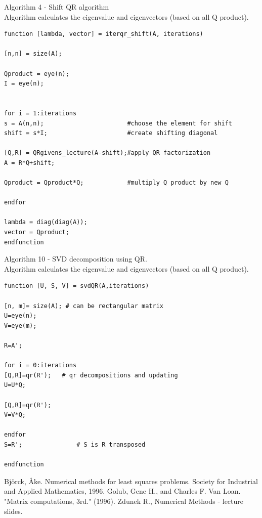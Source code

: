 \documentclass[eng,openany]{mgr}
\begin{document}
Algorithm 4 - Shift QR algorithm\\
Algorithm calculates the eigenvalue and eigenvectors (based on all Q product).
\begin{lstlisting}
function [lambda, vector] = iterqr_shift(A, iterations)

[n,n] = size(A);

Qproduct = eye(n);
I = eye(n);


for i = 1:iterations
s = A(n,n);                       #choose the element for shift
shift = s*I;                      #create shifting diagonal

[Q,R] = QRgivens_lecture(A-shift);#apply QR factorization
A = R*Q+shift;

Qproduct = Qproduct*Q;            #multiply Q product by new Q

endfor

lambda = diag(diag(A));
vector = Qproduct;
endfunction
\end{lstlisting}

Algorithm 10 - SVD decomposition using QR.\\
Algorithm calculates the eigenvalue and eigenvectors (based on all Q product).
\begin{lstlisting}
function [U, S, V] = svdQR(A,iterations)

[n, m]= size(A); # can be rectangular matrix
U=eye(n);   
V=eye(m);

R=A';  

for i = 0:iterations
[Q,R]=qr(R');   # qr decompositions and updating  
U=U*Q;    
     
[Q,R]=qr(R');
V=V*Q;

endfor
S=R';               # S is R transposed

endfunction
\end{lstlisting}
\begin{thebibliography}{8}
Björck, Åke. Numerical methods for least squares problems. Society for Industrial and Applied Mathematics, 1996.
Golub, Gene H., and Charles F. Van Loan. "Matrix computations, 3rd." (1996).
Zdunek R., Numerical Methods - lecture slides.
\end{thebibliography}
\end{document}
